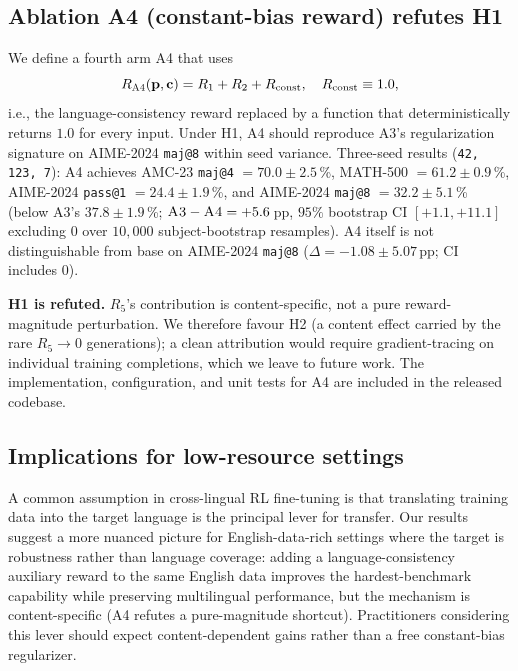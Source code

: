 \documentclass[journal,onecolumn,11pt]{IEEEtran}
\newcommand{\armC}{\textsc{A3}}
\newcommand{\armD}{\textsc{A4}}
\newcommand{\R}[1]{R_{#1}}
\begin{document}
\subsection{Ablation \armD{} (constant-bias reward) refutes H1}
We define a fourth arm \armD{} that uses
\begin{equation*}
R_{\armD{}}(\mathbf{p},\mathbf{c}) = \R{1}+\R{2}+\R{\text{const}}, \quad
\R{\text{const}} \equiv 1.0,
\end{equation*}
i.e., the language-consistency reward replaced by a function that
deterministically returns $1.0$ for every input. Under H1, \armD{}
should reproduce \armC{}'s regularization signature on AIME-2024
\texttt{maj@8} within seed variance. Three-seed results
(\texttt{42, 123, 7}): \armD{} achieves AMC-23 \texttt{maj@4}
$=70.0\pm 2.5$\,\%, MATH-500 $=61.2\pm 0.9$\,\%, AIME-2024
\texttt{pass@1} $=24.4\pm 1.9$\,\%, and AIME-2024 \texttt{maj@8}
$=32.2\pm 5.1$\,\% (below \armC{}'s $37.8\pm 1.9$\,\%;
$\armC{}-\armD{} = +5.6$\,pp, $95\%$ bootstrap CI $[+1.1, +11.1]$
excluding $0$ over $10{,}000$ subject-bootstrap resamples). \armD{}
itself is not distinguishable from base on AIME-2024 \texttt{maj@8}
($\Delta=-1.08\pm 5.07$\,pp; CI includes $0$).

\textbf{H1 is refuted.} $\R{5}$'s contribution is content-specific, not
a pure reward-magnitude perturbation. We therefore favour H2 (a content
effect carried by the rare $\R{5}\to 0$ generations); a clean
attribution would require gradient-tracing on individual training
completions, which we leave to future work. The implementation,
configuration, and unit tests for \armD{} are included in the released
codebase.

\subsection{Implications for low-resource settings}
A common assumption in cross-lingual RL fine-tuning is that translating
training data into the target language is the principal lever for
transfer. Our results suggest a more nuanced picture for English-data-rich
settings where the target is robustness rather than language coverage:
adding a language-consistency auxiliary reward to the same English data
improves the hardest-benchmark capability while preserving multilingual
performance, but the mechanism is content-specific (\armD{} refutes a
pure-magnitude shortcut). Practitioners considering this lever should
expect content-dependent gains rather than a free constant-bias
regularizer.
\end{document}
